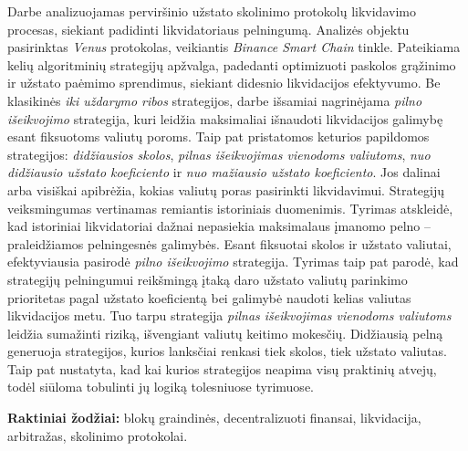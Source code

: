 \documentclass[]{VUMIFTemplateClass}
\begin{document}

\singlespacing


\tableofcontents

\onehalfspacing

Darbe analizuojamas perviršinio užstato skolinimo protokolų likvidavimo procesas, siekiant padidinti likvidatoriaus pelningumą. Analizės objektu pasirinktas \textit{Venus} protokolas, veikiantis \textit{Binance Smart Chain} tinkle. Pateikiama kelių algoritminių strategijų apžvalga, padedanti optimizuoti paskolos grąžinimo ir užstato paėmimo sprendimus, siekiant didesnio likvidacijos efektyvumo. Be klasikinės \textit{iki uždarymo ribos} strategijos, darbe išsamiai nagrinėjama \textit{pilno išeikvojimo} strategija, kuri leidžia maksimaliai išnaudoti likvidacijos galimybę esant fiksuotoms valiutų poroms. Taip pat pristatomos keturios papildomos strategijos: \textit{didžiausios skolos}, \textit{pilnas išeikvojimas vienodoms valiutoms}, \textit{nuo didžiausio užstato koeficiento} ir \textit{nuo mažiausio užstato koeficiento}. Jos dalinai arba visiškai apibrėžia, kokias valiutų poras pasirinkti likvidavimui. Strategijų veiksmingumas vertinamas remiantis istoriniais duomenimis.
Tyrimas atskleidė, kad istoriniai likvidatoriai dažnai nepasiekia maksimalaus įmanomo pelno – praleidžiamos pelningesnės galimybės. Esant fiksuotai skolos ir užstato valiutai, efektyviausia pasirodė \textit{pilno išeikvojimo} strategija. Tyrimas taip pat parodė, kad strategijų pelningumui reikšmingą įtaką daro užstato valiutų parinkimo prioritetas pagal užstato koeficientą bei galimybė naudoti kelias valiutas likvidacijos metu. Tuo tarpu strategija \textit{pilnas išeikvojimas vienodoms valiutoms} leidžia sumažinti riziką, išvengiant valiutų keitimo mokesčių. Didžiausią pelną generuoja strategijos, kurios lanksčiai renkasi tiek skolos, tiek užstato valiutas. Taip pat nustatyta, kad kai kurios strategijos neapima visų praktinių atvejų, todėl siūloma tobulinti jų logiką tolesniuose tyrimuose.

\noindent\textbf{Raktiniai žodžiai:} blokų graindinės, decentralizuoti finansai, likvidacija, arbitražas,  skolinimo protokolai.
\end{document}
